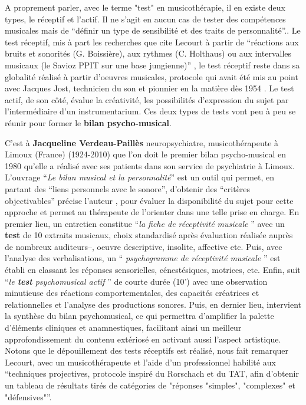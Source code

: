          A proprement parler, avec le terme "test" en musicothérapie, il en existe deux types, le réceptif et l'actif. Il ne s'agit en aucun cas de tester des compétences musicales mais de \enquote {définir un type de sensibilité et des traits de personnalité}.\autocite[83]{lecourt_les_2017}.
Le test réceptif, mis à part les recherches que cite Lecourt à partir de \enquote {réactions aux bruits et sonorités (G. Boissière), aux rythmes (C. Holthaus) ou aux intervalles musicaux (le Savioz PPIT sur une base jungienne)} \autocite[83]{lecourt_les_2017}, le test réceptif reste dans sa globalité réalisé à partir d'oeuvres musicales, protocole qui avait été mis au point avec Jacques Jost, technicien du son et pionnier en la matière dès 1954 \autocite{Jost}.
         Le test actif, de son côté, évalue la créativité, les possibilités d'expression du sujet par l'intermédiaire d'un instrumentarium. Ces deux types  de tests vont peu à peu se réunir pour former
                 le \textbf{ bilan
                     psycho-musical}.


C'est à \textbf{Jacqueline Verdeau-Paillès} neuropsychiatre,
  musicothérapeute à Limoux (France) (1924-2010) que l'on doit le premier bilan
                     psycho-musical en 1980 qu'elle a réalisé avec ses patients dans son service
                     de psychiatrie à Limoux.
L'ouvrage \enquote {\textit{Le bilan musical et la personnalité}}\autocite{verdeau-pailles:bilan}
                     est un outil qui permet, en partant des \enquote {liens personnels avec le sonore}, d'obtenir des \enquote {critères objectivables} précise l'auteur  \autocite[37]{vrait_musicotherapie_2018}, pour évaluer la disponibilité du sujet pour cette
                     approche et permet au thérapeute de l'orienter dans
                                 une telle prise en charge. En premier lieu, un entretien constitue \enquote {\textit{la fiche de réceptivité musicale} } avec un \textbf{test} de 10 extraits musicaux, choix standardisé après évaluation réalisée auprès de nombreux auditeurs--, oeuvre descriptive, insolite, affective etc.
Puis, avec l'analyse des verbalisations, un \enquote { \textit{psychogramme de réceptivité musicale} } est établi en classant les réponses sensorielles, cénestésiques, motrices, etc. Enfin, suit \enquote {\textit{le \textbf{test}  psychomusical actif} } \autocite{verdeau_expression} de courte durée (10') avec une observation minutieuse des réactions comportementales, des capacités créatrices et relationnelles et l'analyse des productions sonores. Puis, en  dernier lieu, intervient la synthèse du bilan psychomusical, ce qui permettra d'amplifier la palette d'éléments
                                cliniques et anamnestiques, facilitant ainsi un meilleur approfondissement du
                                 contenu extériosé en activant aussi l'aspect artistique.
Notons que le dépouillement des tests réceptifs est réalisé, nous fait remarquer Lecourt, avec un musicothérapeute et l'aide d'un professionnel habilité aux \enquote {techniques projectives, protocole inspiré du Rorschach et du TAT, afin d'obtenir un tableau de résultats tirés de catégories de "réponses "simples", "complexes" et "défensives"}\autocite[p.86] {lecourt_les_2017}.

